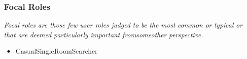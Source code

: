 \subsubsection{Focal Roles}
\label{anhang:Focal_Roles}
\textit{Focal roles are those few user roles judged to be the most common or typical or that are deemed particularly important fromsomeother perspective.}
\cite[Seite 79]{softwareForUse}

\begin{itemize}
	\item CasualSingleRoomSearcher
\end{itemize}
